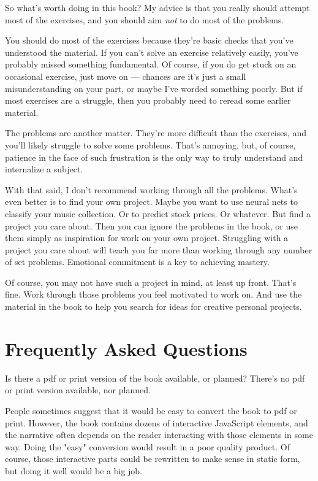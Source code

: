 So what's worth doing in this book? My advice is that you really should attempt most of the exercises, and you should aim \textit{not} to do most of the problems.

You should do most of the exercises because they're basic checks that you've understood the material. If you can't solve an exercise relatively easily, you've probably missed something fundamental. Of course, if you do get stuck on an occasional exercise, just move on --- chances are it's just a small misunderstanding on your part, or maybe I've worded something poorly. But if most exercises are a struggle, then you probably need to reread some earlier material.

The problems are another matter. They're more difficult than the exercises, and you'll likely struggle to solve some problems. That's annoying, but, of course, patience in the face of such frustration is the only way to truly understand and internalize a subject.

With that said, I don't recommend working through all the problems. What's even better is to find your own project. Maybe you want to use neural nets to classify your music collection. Or to predict stock prices. Or whatever. But find a project you care about. Then you can ignore the problems in the book, or use them simply as inspiration for work on your own project. Struggling with a project you care about will teach you far more than working through any number of set problems. Emotional commitment is a key to achieving mastery.

Of course, you may not have such a project in mind, at least up front. That's fine. Work through those problems you feel motivated to work on. And use the material in the book to help you search for ideas for creative personal projects.

\section*{Frequently Asked Questions}
\label{sec:FrequentlyAskedQuestions}


Is there a pdf or print version of the book available, or planned? There's no pdf or print version available, nor planned.

People sometimes suggest that it would be easy to convert the book to pdf or print. However, the book contains dozens of interactive JavaScript elements, and the narrative often depends on the reader interacting with those elements in some way. Doing the "easy" conversion would result in a poor quality product. Of course, those interactive parts could be rewritten to make sense in static form, but doing it well would be a big job.

